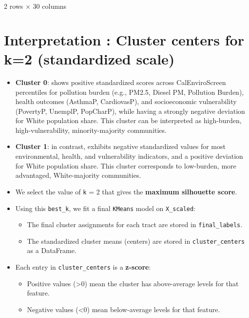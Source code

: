 \documentclass{article}
\begin{document}
\bigskip

2 rows $\times$ 30 columns

\section{Interpretation : Cluster centers for k=2 (standardized scale)}

\begin{itemize}
\item \textbf{Cluster 0}: shows positive standardized scores across CalEnviroScreen percentiles for pollution burden (e.g., PM2.5, Diesel PM, Pollution Burden), health outcomes (AsthmaP, CardiovasP), and socioeconomic vulnerability (PovertyP, UnemplP, PopCharP), while having a strongly negative deviation for White population share. This cluster can be interpreted as high-burden, high-vulnerability, minority-majority communities.
\item \textbf{Cluster 1}:  in contrast, exhibits negative standardized values for most environmental, health, and vulnerability indicators, and a positive deviation for White population share. This cluster corresponds to low-burden, more advantaged, White-majority communities.
\end{itemize}

\begin{itemize}
\item We select the value of \texttt{k} = 2  that gives the \textbf{maximum silhouette score}.
\item Using this \texttt{best\_k}, we fit a final \texttt{KMeans} model on \texttt{X\_scaled}:

\begin{itemize}
\item The final cluster assignments for each tract are stored in \texttt{final\_labels}.
\item The standardized cluster means (centers) are stored in \texttt{cluster\_centers} as a DataFrame.
\end{itemize}


\item Each entry in \texttt{cluster\_centers} is a \textbf{z-score}:

\begin{itemize}
\item Positive values (\textgreater  0) mean the cluster has above-average levels for that feature.
\item Negative values (\textless  0) mean below-average levels for that feature.
\end{itemize}
\end{itemize}
\end{document}
